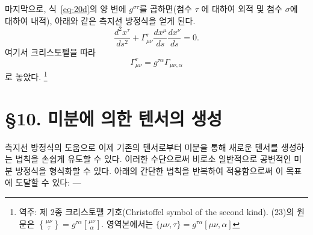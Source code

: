 \documentclass[b5paper]{article}
\begin{document}
마지막으로, 식~\eqref{eq-20d}의 양 변에 $g^{\sigma\tau}$를 곱하면(첨수 $\tau$ 에 대하여 외적 및 첨수 $\sigma$에 대하여 내적), 아래와 같은 측지선 방정식을 얻게 된다.
\begin{equation} \label{eq-22}
	\dfrac{d^2 x^\tau}{ds^2}+\Gamma_{\mu\nu}^\tau \dfrac{dx^\mu}{ds} \dfrac{dx^\nu}{ds}=0.
\end{equation}
여기서 크리스토펠을 따라
\begin{equation} \label{eq-23}
	\Gamma_{\mu\nu}^\tau = g^{\tau\alpha}\Gamma_{\mu\nu,\alpha}
\end{equation}
로 놓았다. \footnote{역주: 제 2종 크리스토펠 기호(Christoffel symbol of the second kind). (23)의 원문은 $\genfrac\{\}{0pt}{1}{\mu\nu}{\tau}=g^{\tau\alpha}\genfrac[]{0pt}{1}{\mu\nu}{\alpha}$. 영역본에서는 $\{\mu\nu,\tau\}=g^{\tau\alpha}[\mu\nu,\alpha]$}

\section*{\S 10. 미분에 의한 텐서의 생성}

측지선 방정식의 도움으로 이제 기존의 텐서로부터 미분을 통해 새로운 텐서를 생성하는 법칙을 손쉽게 유도할 수 있다. 이러한 수단으로써 비로소 일반적으로 공변적인 미분 방정식을 형식화할 수 있다. 아래의 간단한 법칙을 반복하여 적용함으로써 이 목표에 도달할 수 있다: ---
  
\end{document}
